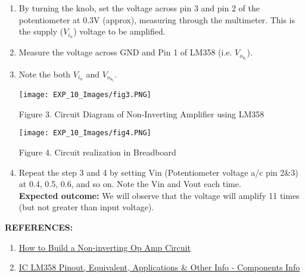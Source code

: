\documentclass[12pt,a4paper]{article}
\begin{document}
\begin{justify}
\begin{enumerate}
\item By turning the knob, set the voltage across pin 3 and pin 2 of the potentiometer at 0.3V (approx), measuring through the multimeter. This is the supply ($V_i_n$)  voltage to be amplified.

\item Measure the voltage across GND and Pin 1 of LM358 (i.e. $V_o_u_t$).

\item Note the both $V_i_n$ and $V_o_u_t$.




\vspace{20mm}
\begin{center} 
\texttt{[image: EXP\_10\_Images/fig3.PNG]}
\end{center}
\begin{center} {Figure 3. Circuit Diagram of Non-Inverting Amplifier using LM358}\end{center}

\begin{center} 
\texttt{[image: EXP\_10\_Images/fig4.PNG]}
\end{center}
\begin{center} {Figure 4. Circuit realization in Breadboard}\end{center}

\item Repeat the step 3 and 4 by setting Vin (Potentiometer voltage a/c pin 2&3) at 0.4, 0.5, 0.6, and so on. Note the Vin and Vout each time.\\

\noindent \textbf{Expected outcome:} We will observe that the voltage will amplify 11 times (but not greater than input voltage).


\end{enumerate}

\textbf{\large REFERENCES:}
\vspace{-6mm}
\begin{enumerate}
\setlength\itemsep{-0.3em}
\item  \href {http://www.learningaboutelectronics.com/Articles/Non-inverting-op-amp-circuit.php}{How to Build a Non-inverting Op Amp Circuit }
\item  \href {https://www.componentsinfo.com/ic-lm358-pinout-equivalent/}{IC LM358 Pinout, Equivalent, Applications \& Other Info - Components Info}
\end{enumerate}

\end{justify}
\end{document}
